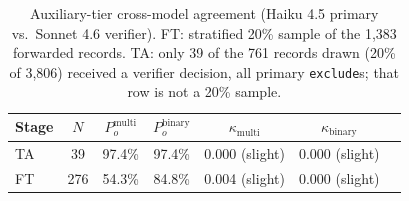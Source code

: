 \begin{table}[htbp]
\centering
\caption{Auxiliary-tier cross-model agreement (Haiku 4.5 primary vs.\ Sonnet 4.6 verifier). FT: stratified 20\% sample of the 1{,}383 forwarded records. TA: only 39 of the 761 records drawn (20\% of 3{,}806) received a verifier decision, all primary \texttt{exclude}s; that row is not a 20\% sample.}
\label{tab:aux-kappa-results}
\begin{tabular}{lcccccc}
\toprule
Stage & $N$ & $P_o^{\text{multi}}$ & $P_o^{\text{binary}}$ & $\kappa_{\text{multi}}$ & $\kappa_{\text{binary}}$ \\
\midrule
TA & 39 & 97.4\% & 97.4\% & 0.000 (slight) & 0.000 (slight) \\
FT & 276 & 54.3\% & 84.8\% & 0.004 (slight) & 0.000 (slight) \\
\bottomrule
\end{tabular}
\end{table}